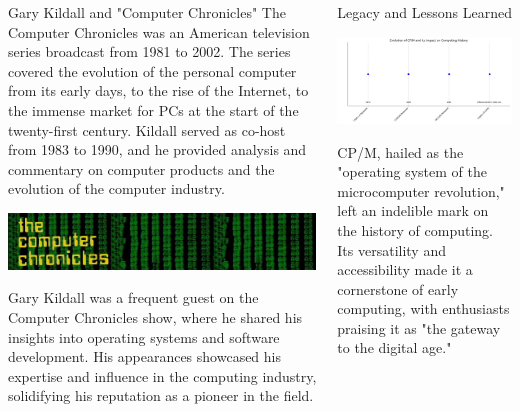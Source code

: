 \documentclass{beamer}
\begin{document}
\begin{frame}[t]{}
\begin{columns}
\begin{column}[T]{0.72\textwidth}
\begin{columns}[t]
\begin{column}{0.52\textwidth}
\begin{block}{\large Gary Kildall and "Computer Chronicles"}
  The Computer Chronicles was an American television series broadcast from 1981
to 2002. The series covered the evolution of the personal computer from its early
days, to the rise of the Internet, to the immense market for PCs at the start of the
twenty-first century. Kildall served as co-host from 1983 to 1990, and he provided
analysis and commentary on computer products and the evolution of the computer
industry.\cite{giants}

  \begin{center}
    \includegraphics[width=0.99\linewidth]{images/show.jpg} %
\end{center}

Gary Kildall was a frequent guest on the Computer Chronicles show, where he shared his insights into operating systems and software development. His appearances showcased his expertise and influence in the computing industry, solidifying his reputation as a pioneer in the field.\cite{fire}
\end{block}

\end{column}

\begin{column}{0.46\textwidth}

\begin{block}{\large Legacy and Lessons Learned}
  \begin{center}
    \includegraphics[width=0.8\linewidth]{images/timeline.jpg} %
\end{center}
  CP/M, hailed as the "operating system of the microcomputer revolution," left an indelible mark on the history of computing. Its versatility and accessibility made it a cornerstone of early computing, with enthusiasts praising it as "the gateway to the digital age."


\end{block}
\end{column}
\end{columns}
\end{column}
\end{columns}
\end{frame}
\end{document}
